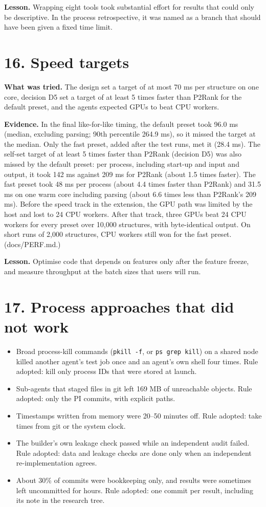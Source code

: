 \documentclass[10pt,letterpaper]{article}
\begin{document}
\textbf{Lesson.} Wrapping eight tools took substantial effort for results that could only be descriptive. In the process retrospective, it was named as a branch that should have been given a fixed time limit.

\section*{16. Speed targets}

\textbf{What was tried.} The design set a target of at most 70 ms per structure on one core, decision D5 set a target of at least 5 times faster than P2Rank for the default preset, and the agents expected GPUs to beat CPU workers.

\textbf{Evidence.} In the final like-for-like timing, the default preset took 96.0 ms (median, excluding parsing; 90th percentile 264.9 ms), so it missed the target at the median. Only the fast preset, added after the test runs, met it (28.4 ms). The self-set target of at least 5 times faster than P2Rank (decision D5) was also missed by the default preset: per process, including start-up and input and output, it took 142 ms against 209 ms for P2Rank (about 1.5 times faster). The fast preset took 48 ms per process (about 4.4 times faster than P2Rank) and 31.5 ms on one warm core including parsing (about 6.6 times less than P2Rank's 209 ms). Before the speed track in the extension, the GPU path was limited by the host and lost to 24 CPU workers. After that track, three GPUs beat 24 CPU workers for every preset over 10,000 structures, with byte-identical output. On short runs of 2,000 structures, CPU workers still won for the fast preset. (docs/PERF.md.)

\textbf{Lesson.} Optimise code that depends on features only after the feature freeze, and measure throughput at the batch sizes that users will run.

\section*{17. Process approaches that did not work}

\begin{itemize}
\item Broad process-kill commands (\texttt{pkill -f}, or \texttt{ps \textbar{} grep \textbar{} kill}) on a shared node killed another agent's test job once and an agent's own shell four times. Rule adopted: kill only process IDs that were stored at launch.
\item Sub-agents that staged files in git left 169 MB of unreachable objects. Rule adopted: only the PI commits, with explicit paths.
\item Timestamps written from memory were 20--50 minutes off. Rule adopted: take times from git or the system clock.
\item The builder's own leakage check passed while an independent audit failed. Rule adopted: data and leakage checks are done only when an independent re-implementation agrees.
\item About 30\% of commits were bookkeeping only, and results were sometimes left uncommitted for hours. Rule adopted: one commit per result, including its note in the research tree.
\end{itemize}
\end{document}
